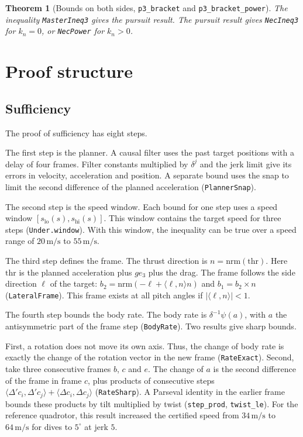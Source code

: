 \documentclass[11pt]{article}
\newtheorem{theorem}{Theorem}
\theoremstyle{definition}
\newcommand{\ip}[2]{\langle #1,#2\rangle}
\newcommand{\lean}[1]{\texttt{\small #1}}
\newcommand{\ms}{\,\mathrm{m/s}}
\begin{document}
\begin{theorem}[Bounds on both sides, \lean{p3\_bracket} and \lean{p3\_bracket\_power}]
The inequality \lean{MasterIneq3} gives the pursuit result.
The pursuit result gives \lean{NecIneq3} for $k_n = 0$, or \lean{NecPower} for $k_n > 0$.
\end{theorem}

\section{Proof structure}

\subsection{Sufficiency}

The proof of sufficiency has eight steps.

The first step is the planner.
A causal filter uses the past target positions with a delay of four frames.
Filter constants multiplied by $\delta^j$ and the jerk limit give its errors in velocity,
acceleration and position.
A separate bound uses the snap to limit the second difference of the planned acceleration
(\lean{PlannerSnap}).

The second step is the speed window.
Each bound for one step uses a speed window $[s_{\mathrm{lo}}(s), s_{\mathrm{hi}}(s)]$.
This window contains the target speed for three steps (\lean{Under.window}).
With this window, the inequality can be true over a speed range of $20\ms$ to $55\ms$.

The third step defines the frame.
The thrust direction is $n = \mathrm{nrm}(\mathrm{thr})$.
Here $\mathrm{thr}$ is the planned acceleration plus $g e_3$ plus the drag.
The frame follows the side direction $\ell$ of the target:
$b_2 = \mathrm{nrm}(-\ell + \ip{\ell}{n} n)$ and $b_1 = b_2 \times n$ (\lean{LateralFrame}).
This frame exists at all pitch angles if $|\ip{\ell}{n}| < 1$.

The fourth step bounds the body rate.
The body rate is $\delta^{-1}\psi(a)$, with $a$ the antisymmetric part of the frame step
(\lean{BodyRate}).
Two results give sharp bounds.

First, a rotation does not move its own axis.
Thus, the change of body rate is exactly the change of the rotation vector in the new frame
(\lean{RateExact}).
Second, take three consecutive frames $b$, $c$ and $e$.
The change of $a$ is the second difference of the frame in frame $c$, plus products of consecutive
steps $\ip{\Delta' c_i}{\Delta' c_j} + \ip{\Delta c_i}{\Delta c_j}$ (\lean{RateSharp}).
A Parseval identity in the earlier frame bounds these products by tilt multiplied by twist
(\lean{step\_prod}, \lean{twist\_le}).
For the reference quadrotor, this result increased the certified speed from $34\ms$ to $64\ms$ for
dives to $5^\circ$ at jerk $5$.
\end{document}
